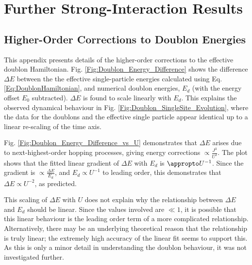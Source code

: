 \chapter{Further Strong-Interaction Results}\label{App:Strong_Interactions}

\section{Higher-Order Corrections to Doublon Energies}\label{App:DoublonHigherOrder}

This appendix presents details of the higher-order corrections to the effective doublon Hamiltonian. Fig. \ref{Fig:Doublon_Energy_Difference} shows the difference $\Delta E$ between the the effective single-particle energies calculated using Eq. \ref{Eq:DoublonHamiltonian}, and numerical doublon energies, $E_d$ (with the energy offset $E_0$ subtracted). $\Delta E$ is found to scale linearly with $E_d$. This explains the observed dynamical behaviour in Fig. \ref{Fig:Doublon_SingleSite_Evolution}, where the data for the doublons and the effective single particle appear identical up to a linear re-scaling of the time axis. 

Fig. \ref{Fig:Doublon_Energy_Difference_vs_U} demonstrates that $\Delta E$ arises due to next-highest-order hopping processes, giving energy corrections $\propto \frac{J^3}{U^2}$. The plot shows that the fitted linear gradient of $\Delta E$ with $E_d$ is $\appropto U^{-1}$. Since the gradient is $\propto \frac{\Delta E}{E_d}$, and $E_d\propto U^{-1}$ to leading order, this demonstrates that $\Delta E\propto U^{-2}$, as predicted.

This scaling of $\Delta E$ with $U$ does not explain why the relationship between $\Delta E$ and $E_d$ should be linear. Since the values involved are $\ll1$, it is possible that this linear behaviour is the leading order term of a more complicated relationship. Alternatively, there may be an underlying theoretical reason that the relationship is truly linear; the extremely high accuracy of the linear fit seems to support this. As this is only a minor detail in understanding the doublon behaviour, it was not investigated further.

\newpage

